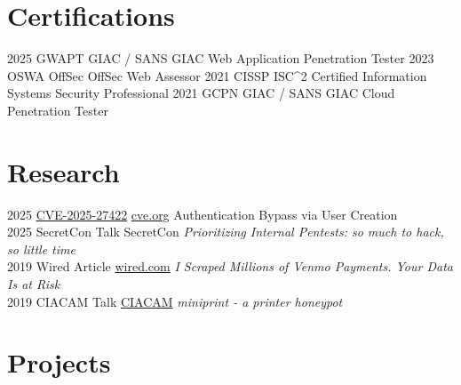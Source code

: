 \documentclass[a4paper]{twentysecondcv} %
\begin{document}
\section{Certifications}

\begin{twenty}
    \twentyitem
    {2025}
    {}
    {GWAPT}
    {GIAC / SANS}
    {GIAC Web Application Penetration Tester}
    {}
    \twentyitem
    {2023}
    {}
    {OSWA}
    {OffSec}
    {OffSec Web Assessor}
    {}
    \twentyitem
    {2021}
    {}
    {CISSP}
    {ISC^2}
    {Certified Information Systems Security Professional}
    {}
    {}
    \twentyitem
    {2021}
    {}
    {GCPN}
    {GIAC / SANS}
    {GIAC Cloud Penetration Tester}
    {}
\end{twenty}
\vspace{-5mm}

\section{Research}
\begin{twenty} %
    \twentyitem
    	{2025}
		{}
        {\href{https://github.com/factionsecurity/faction/security/advisories/GHSA-97cv-f342-v2jc}{CVE-2025-27422}}
        {\href{https://www.cve.org/CVERecord?id=CVE-2025-27422}{cve.org}}
        {\vspace{-2mm}}
        {Authentication Bypass via User Creation}
\\
    \twentyitem
    	{2025}
		{}
        {SecretCon Talk}
        {SecretCon}
        {\vspace{-2mm}}
        {\textit{Prioritizing Internal Pentests: so much to hack, so little time}}
\\
    \twentyitem
    	{2019}
		{}
        {Wired Article}
        {\href{https://www.wired.com/story/i-scraped-millions-of-venmo-payments-your-data-is-at-risk/}{wired.com}}
        {\vspace{-2mm}}
        {\textit{I Scraped Millions of Venmo Payments. Your Data Is at Risk}}
\\
    \twentyitem
    	{2019}
		{}
        {CIACAM Talk}
        {\href{https://minneapolis.hosting.acm.org/ciacam/}{CIACAM}}
        {\vspace{-2mm}}
        {\textit{miniprint - a printer honeypot}}
\end{twenty}

{\vspace{-2mm}}
\section{Projects}
\end{document}
